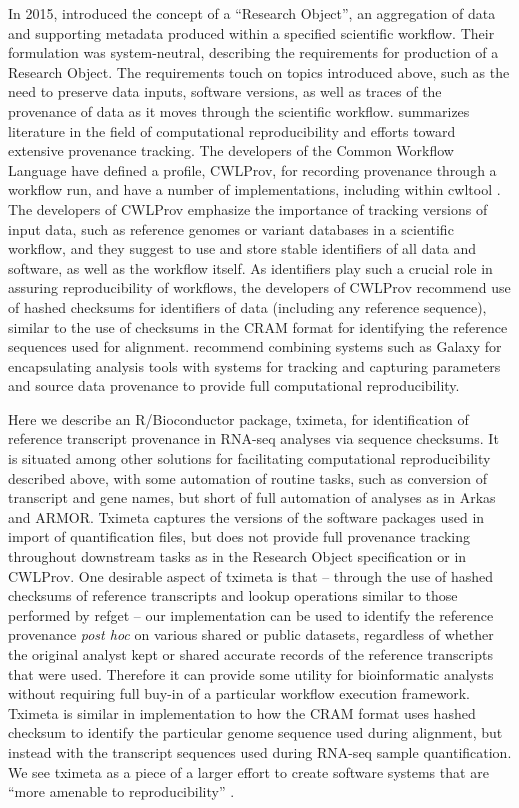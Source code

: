 \documentclass[12pt]{article} \usepackage[utf8]{inputenc}
\begin{document}
In 2015, \citet{Belhajjame2015} introduced the concept of a ``Research
Object'', an aggregation of data and supporting metadata produced
within a specified scientific workflow. Their formulation was
system-neutral, describing the requirements for production of a
Research Object. The requirements touch on topics introduced above,
such as the need to preserve data inputs, software versions, as well
as traces of the provenance of data as it moves through the scientific
workflow. \citet{Belhajjame2015} summarizes literature in the field of
computational reproducibility and efforts toward extensive provenance
tracking. The developers of the Common Workflow Language \citep{cwl}
have defined a profile, CWLProv, for recording provenance through a
workflow run, and have a number of implementations, including within
cwltool \citep{Khan2018}. The developers of CWLProv emphasize the
importance of tracking versions of input data, such as reference
genomes or variant databases in a scientific workflow, and they
suggest to use and store stable identifiers of all data and software,
as well as the workflow itself. As identifiers play such a crucial
role in assuring reproducibility of workflows, the developers of
CWLProv recommend use of hashed checksums for identifiers of data
(including any reference sequence), similar to the use of checksums in
the CRAM format for identifying the reference sequences used for
alignment. \citet{Gruning2018} recommend combining systems such as
Galaxy for encapsulating analysis tools with systems for tracking and
capturing parameters and source data provenance to provide full
computational reproducibility.

Here we describe an R/Bioconductor package, tximeta, for identification
of reference transcript provenance in RNA-seq analyses via sequence
checksums. It is situated among other solutions for facilitating
computational reproducibility described above, with some automation of
routine tasks, such as conversion of transcript and gene names, but
short of full automation of analyses as in Arkas and ARMOR. Tximeta
captures the versions of the software packages used in import of
quantification files, but does not provide full provenance tracking
throughout downstream tasks as in the Research Object specification or
in CWLProv. One desirable aspect of tximeta is that -- through the use
of hashed checksums of reference transcripts and lookup operations
similar to those performed by refget -- our implementation can be used
to identify the reference provenance \textit{post hoc} on various
shared or public datasets, regardless of whether the original analyst
kept or shared accurate records of the reference transcripts that were
used. Therefore it can provide some utility for bioinformatic analysts
without requiring full buy-in of a particular workflow execution
framework. Tximeta is similar in implementation to how the CRAM format
uses hashed checksum to identify the particular genome sequence used
during alignment, but instead with the transcript sequences used during
RNA-seq sample quantification. We see tximeta as a piece of a larger
effort to create software systems that are ``more amenable to
reproducibility'' \citep{Peng2011}.
\end{document}
